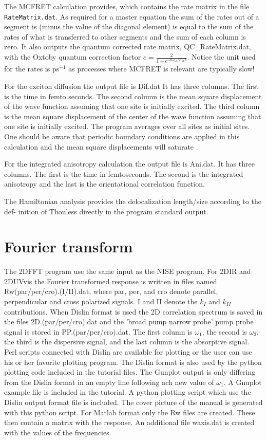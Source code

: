The MCFRET calculation provides, which contains the rate matrix in the file  {\tt RateMatrix.dat}. As required for a master equation the sum of the rates out of a segment is (minus the value of the diagonal element) is equal to the sum of the rates of what is transferred to other segments and the sum of each column is zero. It also outputs the quantum corrected rate matrix, QC\_RateMatrix.dat, with the Oxtoby quantum correction factor $c = \frac{2}{1+e^{-\hbar \omega_{ab}/K_BT}}$. Notice the unit used for the rates is ps$^{-1}$ as processes where MCFRET is relevant are typically slow!

For the exciton diffusion the output file is Dif.dat It has three columns. The first is the time in femto seconds. The second column is the mean square displacement of the wave function assuming that
one site is initially excited. The third column is the mean square displacement of the center of the 
wave function assuming that one site is initially excited. The program averages over all sites as
initial sites. One should be aware that periodic boundary conditions are applied in this calculation
and the mean square displacements will saturate \cite{Jansen.2010.JCP.132.224503}.

For the integrated anisotropy calculation the output file is Ani.dat. It has three columns. The first is the time in femtoseconds. The second is the integrated anisotropy and the last is the orientational correlation function.

The Hamiltonian analysis provides the delocalization length/size according to the def- 
inition of Thouless \cite{Thouless.1974.PR.13.93} directly in the program standard output. 

\section{Fourier transform \label{sec:Fourier}}
The 2DFFT program use the same input as the NISE program.
For 2DIR and 2DUVvis the Fourier transformed response is written in files named Rw(par/per/cro).(I/II).dat, where par, per, and cro denote parallel, perpendicular and cross polarized signals. I and II denote the $k_I$ and $k_{II}$ contributions. When Dislin format is used the 2D correlation spectrum is saved in the files 2D.(par/per/cro).dat and the 'broad pump narrow probe' pump probe signal is stored in PP.(par/per/cro).dat. 
The first column is $\omega_1$, the second is $\omega_3$, the third is the dispersive signal, and the
last column is the absorptive signal. Perl scripts connected with Dislin are available for plotting or the
user can use his or her favorite plotting program. The Dislin format is also used by the python plotting code included in the tutorial files.
The Gunplot output is only differing from the Dislin format in an empty line following ach new value of $\omega_1$. A Gnuplot example file is included in the tutorial. A python plotting script which use the Dislin output format file is included. The cover picture 
of the manual is generated with this python script.
 For Matlab format only the Rw files are created. These
then contain a matrix with the response. An additional file waxis.dat is created with the values of the
frequencies.

